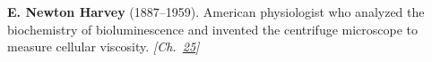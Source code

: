 \textbf{E. Newton Harvey} (1887–1959). American physiologist who analyzed the biochemistry of bioluminescence and invented the centrifuge microscope to measure cellular viscosity. \emph{[Ch.~\hyperref[ch:fireflybioluminescence]{25}]}

